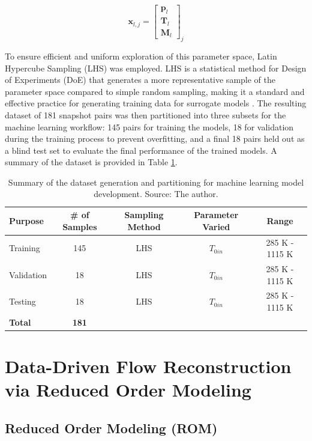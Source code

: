 \documentclass[tg, EN]{ufabcFHZh_tg}
\begin{document}
\begin{equation}
    \mathbf{x}_{l,j} = 
    \begin{bmatrix}
        \mathbf{p}_l \\
        \mathbf{T}_l \\
        \mathbf{M}_l
    \end{bmatrix}_j
\end{equation}


To ensure efficient and uniform exploration of this parameter space, Latin Hypercube Sampling (LHS) was employed. LHS is a statistical method for Design of Experiments (DoE) that generates a more representative sample of the parameter space compared to simple random sampling, making it a standard and effective practice for generating training data for surrogate models \citep{yu2019}. The resulting dataset of 181 snapshot pairs was then partitioned into three subsets for the machine learning workflow: 145 pairs for training the models, 18 for validation during the training process to prevent overfitting, and a final 18 pairs held out as a blind test set to evaluate the final performance of the trained models. A summary of the dataset is provided in Table \ref{tab:dataset_summary}.

\begin{table}[H]
\centering
\caption{Summary of the dataset generation and partitioning for machine learning model development. Source: The author.}
\label{tab:dataset_summary}
\begin{tabular}{lcccc}
\toprule
\textbf{Purpose} & \textbf{\# of Samples} & \textbf{Sampling Method} & \textbf{Parameter Varied} & \textbf{Range} \\
\midrule
Training & 145 & LHS &  $T_{0in}$ & 285 K - 1115 K \\
Validation & 18 & LHS & $T_{0in}$ & 285 K - 1115 K \\
Testing & 18 & LHS &  $T_{0in}$ & 285 K - 1115 K \\
\midrule
\textbf{Total} & \textbf{181} & & & \\
\bottomrule
\end{tabular}
\end{table}


\chapter{Data-Driven Flow Reconstruction via Reduced Order Modeling}
\label{chap:rom_framework}

\section{Reduced Order Modeling (ROM)}
\end{document}
